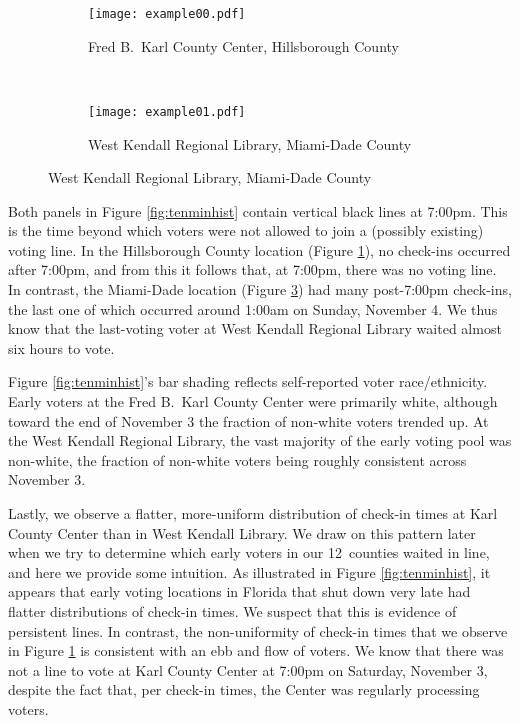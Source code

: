 \documentclass[12pt,titlepage]{article}
\newcommand{\numcounties}{12}
\begin{document}
\begin{figure}[!ht]
  \caption{Early voting check-in times on Saturday, November 3, 2012,
    in two locations}
  \label{fig:tenminhist}
  \centering
  \begin{subfigure}[b]{\linewidth}
    \centering\texttt{[image: example00.pdf]}
    \caption{Fred B.\ Karl County Center, Hillsborough County}
    \label{fig:karlexample}
  \end{subfigure}%
  \\
  \begin{subfigure}[b]{\linewidth}
    \centering\texttt{[image: example01.pdf]}
    \caption{West Kendall Regional Library, Miami-Dade County}
    \label{fig:kendallexample}
  \end{subfigure}
\end{figure}

Both panels in Figure \ref{fig:tenminhist} contain vertical black
lines at 7:00pm. This is the time beyond which voters were not allowed
to join a (possibly existing) voting line. In the Hillsborough County
location (Figure \ref{fig:karlexample}), no check-ins occurred after
7:00pm, and from this it follows that, at 7:00pm, there was no voting
line. In contrast, the Miami-Dade location (Figure
\ref{fig:kendallexample}) had many post-7:00pm check-ins, the last one
of which occurred around 1:00am on Sunday, November 4. We thus know
that the last-voting voter at West Kendall Regional Library waited
almost six hours to vote.

Figure \ref{fig:tenminhist}'s bar shading reflects self-reported voter
race/ethnicity. Early voters at the Fred B.\ Karl County Center were
primarily white, although toward the end of November 3 the fraction of
non-white voters trended up. At the West Kendall Regional Library, the
vast majority of the early voting pool was non-white, the fraction of
non-white voters being roughly consistent across November 3.

Lastly, we observe a flatter, more-uniform distribution of check-in
times at Karl County Center than in West Kendall Library. We draw on
this pattern later when we try to determine which early voters in our
\numcounties\ counties waited in line, and here we provide some
intuition. As illustrated in Figure \ref{fig:tenminhist}, it appears
that early voting locations in Florida that shut down very late had
flatter distributions of check-in times. We suspect that this is
evidence of persistent lines. In contrast, the non-uniformity of
check-in times that we observe in Figure \ref{fig:karlexample} is
consistent with an ebb and flow of voters. We know that there was not
a line to vote at Karl County Center at 7:00pm on Saturday, November
3, despite the fact that, per check-in times, the Center was regularly
processing voters.
\end{document}
